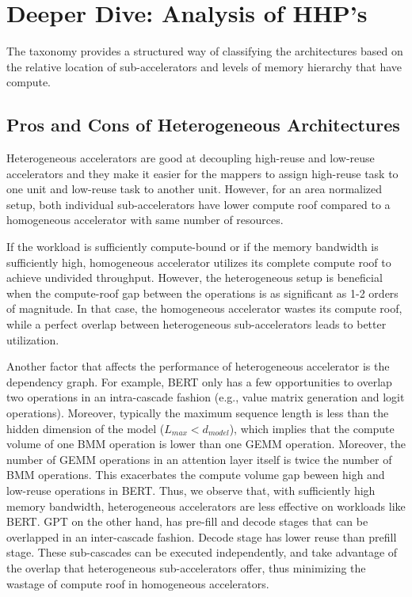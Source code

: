 \section{Deeper Dive: Analysis of HHP's}


The \HHPName taxonomy provides a structured way of classifying the architectures based on the relative location of sub-accelerators and levels of memory hierarchy that have compute.

\subsection{Pros and Cons of Heterogeneous Architectures}

Heterogeneous accelerators are good at decoupling high-reuse and low-reuse accelerators and they make it easier for the mappers to assign high-reuse task to one unit and low-reuse task to another unit. However, for an area normalized setup, both individual sub-accelerators have lower compute roof compared to a homogeneous accelerator with same number of resources. 

If the workload is sufficiently compute-bound or if the memory bandwidth is sufficiently high, homogeneous accelerator utilizes its complete compute roof to achieve undivided throughput. However, the heterogeneous setup is beneficial when the compute-roof gap between the operations is as significant as 1-2 orders of magnitude. In that case, the homogeneous accelerator wastes its compute roof, while a perfect overlap between heterogeneous sub-accelerators leads to better utilization.

Another factor that affects the performance of heterogeneous accelerator is the dependency graph. For example, BERT only has a few opportunities to overlap two operations in an intra-cascade fashion (e.g., value matrix generation and logit operations). Moreover, typically the maximum sequence length is less than the hidden dimension of the model ($L_{max}<d_{model}$), which implies that the compute volume of one BMM operation is lower than one GEMM operation. Moreover, the number of GEMM operations in an attention layer itself is twice the number of BMM operations. This exacerbates the compute volume gap beween high and low-reuse operations in BERT. Thus, we observe that, with sufficiently high memory bandwidth, heterogeneous accelerators are less effective on workloads like BERT.
GPT on the other hand, has pre-fill and decode stages that can be overlapped in an inter-cascade fashion. Decode stage has lower reuse than prefill stage. These sub-cascades can be executed independently, and take advantage of the overlap that heterogeneous sub-accelerators offer, thus minimizing the wastage of compute roof in homogeneous accelerators.

